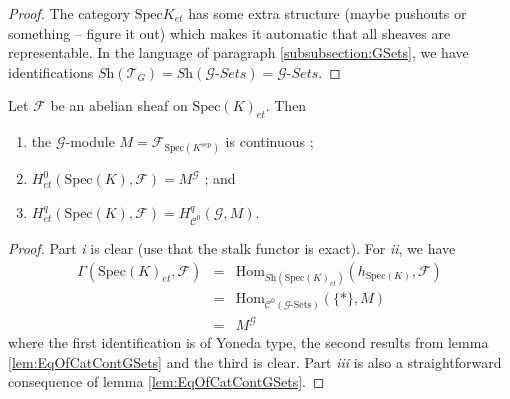 \begin{proof}
The category $\text{Spec} K_{et}$ has some extra structure (maybe pushouts or something -- figure it out) which makes it automatic that all sheaves are representable. In the language of paragraph \ref{subsubsection:GSets}, we have identifications $\textit{Sh}(\mathcal{T}_G) = \textit{Sh}(\mathcal{G}\textit{-Sets}) = \mathcal{G}\textit{-Sets}$.
\end{proof}

\begin{lemma}
Let $\mathcal{F}$ be an abelian sheaf on $\text{Spec}(K)_{et}$. Then
\begin{enumerate}
\item the $\mathcal{G}$-module $M = \mathcal{F}_{\text{Spec}(K^{sep})}$ is continuous ;
\item $H_{et}^0(\text{Spec}(K), \mathcal{F})=M^{\mathcal{G}}$ ; and
\item $H_{et}^q(\text{Spec}(K), \mathcal{F}) = H_{\mathcal{C}^0}^q(\mathcal{G}, M)$.
\end{enumerate}
\end{lemma}

\begin{proof}
Part {\it i} is clear (use that the stalk functor is exact). For {\it ii}, we have 
\begin{eqnarray*}
\Gamma(\text{Spec}(K)_{et}, \mathcal{F}) & = & \text{Hom}_{\textit{Sh}(\text{Spec}(K)_{et})}(h_{\text{Spec}(K)}, \mathcal{F}) \\
& = & \text{Hom}_{\mathcal{C}^0(\mathcal{G}\text{-Sets})}(\{*\}, M) \\
& = &  M^{\mathcal{G}}
\end{eqnarray*}
where the first identification is of Yoneda type, the second results from lemma \ref{lem:EqOfCatContGSets} and the third is clear. Part {\it iii} is also a straightforward consequence of lemma \ref{lem:EqOfCatContGSets}.
\end{proof}

